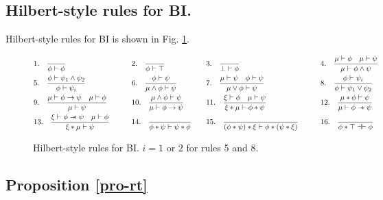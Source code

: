 \documentclass[conference,compsoc, 10pt]{IEEEtran}
\newcommand {\sepimp} {\mathrel{-\mkern-6mu*}}
\newcommand{\sd}{\diamond}%
\newcommand {\sdimp} {\mathrel{-\mkern-2.5mu\diamond}}
\newcommand{\qm}{{\ ?\ }}%
\newcommand {\qmimp} {\mathrel{-\mkern-6mu?}}
\begin{document}
\begin{appendices}
		\subsection{Hilbert-style rules for BI.}
		\label{sec app sub Hilbert-style rules for BI}
		Hilbert-style rules for BI is shown in Fig. \ref{fig HR for BI}.
		\begin{figure}[h]
			\small
			\begin{align*}
			&1. \quad \frac{}{\phi\vdash\phi}  \qquad
			&&2. \quad \frac{}{\phi\vdash\top} \qquad 
			&&3. \quad \frac{}{\bot\vdash\phi} \qquad
			&&4. \quad \frac{\mu\vdash\phi\quad\mu\vdash\psi}{\mu\vdash\phi\wedge\psi} \\
			&5. \quad \frac{\phi\vdash\psi_1\wedge\psi_2}{\phi\vdash\psi_i} \quad
			&&6. \quad \frac{\phi\vdash\psi}{\mu\wedge\phi\vdash\psi} \qquad
			&&7. \quad \frac{\mu\vdash\psi\quad\phi\vdash\psi}{\mu\vee\phi\vdash\psi} \qquad
			&&8. \quad \frac{\phi\vdash\psi_i}{\phi\vdash\psi_1\vee\psi_2} \\
			&9. \quad \frac{\mu\vdash\phi\rightarrow\psi\quad\mu\vdash\phi}{\mu\vdash\psi} \quad
			&&10. \quad \frac{\mu\wedge\phi\vdash\psi}{\mu\vdash\phi\rightarrow\psi} \quad 
			&&11. \quad \frac{\xi\vdash\phi\quad\mu\vdash\psi}{\xi\ast\mu\vdash\phi\ast\psi} \qquad
			&&12. \quad \frac{\mu\ast\phi\vdash\psi}{\mu\vdash\phi\sepimp\psi} \\
			&13. \quad \frac{\xi\vdash\phi\sepimp\psi\quad\mu\vdash\phi }{\xi\ast\mu\vdash\psi} \qquad
			&&14. \quad \frac{}{\phi\ast\psi\vdash\psi\ast\phi} \quad
			&&15. \quad \frac{}{(\phi\ast\psi)\ast\xi\vdash\phi\ast(\psi\ast\xi)} \qquad
			&&16. \quad \frac{}{\phi\ast\top\dashv\vdash\phi} 
			\end{align*}
			\caption{Hilbert-style rules for BI\cite{Pym02,Doc19}. $i=1$ or $2$ for rules 5 and 8. 
			}
			\label{fig HR for BI}
		\end{figure}
		
		\subsection{Proposition \ref{pro-rt}}
		

\end{appendices}
\end{document}
